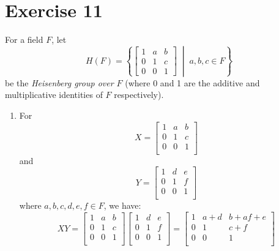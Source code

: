 \documentclass{article}
\begin{document}
    \section*{Exercise 11}
    For a field $F$,
    let \[H(F) = \left\{
    \begin{bmatrix} 1 & a & b \\ 0 & 1 & c \\ 0 & 0 & 1 \end{bmatrix}
    \; \middle\vert \; a, b, c \in F \right\}\]
    be the \textit{Heisenberg group over $F$} (where 0 and 1 are the
    additive and multiplicative identities of $F$ respectively). \\
    \begin{enumerate}[label=\textbf{\alph*.}]
        \item 
            For
            \[ X =
            \begin{bmatrix}
                1 & a & b \\
                0 & 1 & c \\
                0 & 0 & 1 \\
            \end{bmatrix}
            \]
            and
            \[ Y =
            \begin{bmatrix}
                1 & d & e \\
                0 & 1 & f \\
                0 & 0 & 1 \\
            \end{bmatrix} \]
            where $a, b, c, d, e, f \in F$,
            we have:
            \[ XY =
            \begin{bmatrix}
                1 & a & b \\
                0 & 1 & c \\
                0 & 0 & 1 \\
            \end{bmatrix}
            \begin{bmatrix}
                1 & d & e \\
                0 & 1 & f \\
                0 & 0 & 1 \\
            \end{bmatrix}
            = \begin{bmatrix}
                1 & a+d & b + af + e \\
                0 & 1 & c+f \\
                0 & 0 & 1 \\

\end{bmatrix}\]
\end{enumerate}
\end{document}
